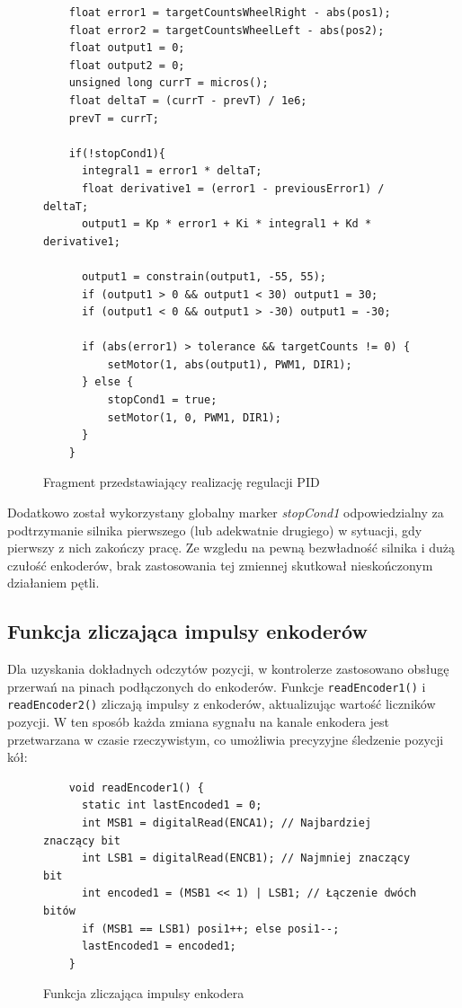 \begin{figure}[H]
  \centering
  \begin{lstlisting}
    float error1 = targetCountsWheelRight - abs(pos1);
    float error2 = targetCountsWheelLeft - abs(pos2);
    float output1 = 0;
    float output2 = 0;
    unsigned long currT = micros();
    float deltaT = (currT - prevT) / 1e6;
    prevT = currT;

    if(!stopCond1){
      integral1 = error1 * deltaT;
      float derivative1 = (error1 - previousError1) / deltaT;
      output1 = Kp * error1 + Ki * integral1 + Kd * derivative1;

      output1 = constrain(output1, -55, 55);
      if (output1 > 0 && output1 < 30) output1 = 30;
      if (output1 < 0 && output1 > -30) output1 = -30;

      if (abs(error1) > tolerance && targetCounts != 0) {
          setMotor(1, abs(output1), PWM1, DIR1);
      } else {
          stopCond1 = true;
          setMotor(1, 0, PWM1, DIR1);
      }
    }
  \end{lstlisting}
  \caption{Fragment przedstawiający realizację regulacji PID}
  \label{fig:pseudokod:pid}
\end{figure}

Dodatkowo został wykorzystany globalny marker \textit{stopCond1} odpowiedzialny za podtrzymanie silnika pierwszego (lub adekwatnie drugiego) w sytuacji, gdy pierwszy z nich zakończy pracę. Ze wzgledu na pewną bezwładność silnika i dużą czułość enkoderów, brak zastosowania tej zmiennej skutkował nieskończonym działaniem pętli. 

\subsection{Funkcja zliczająca impulsy enkoderów}

Dla uzyskania dokładnych odczytów pozycji, w kontrolerze zastosowano obsługę przerwań na pinach podłączonych do enkoderów. Funkcje \texttt{readEncoder1()} i \texttt{readEncoder2()} zliczają impulsy z enkoderów, aktualizując wartość liczników pozycji. W ten sposób każda zmiana sygnału na kanale enkodera jest przetwarzana w czasie rzeczywistym, co umożliwia precyzyjne śledzenie pozycji kół:

\begin{figure}[H]
  \centering
  \begin{lstlisting}
    void readEncoder1() {
      static int lastEncoded1 = 0;
      int MSB1 = digitalRead(ENCA1); // Najbardziej znaczący bit
      int LSB1 = digitalRead(ENCB1); // Najmniej znaczący bit
      int encoded1 = (MSB1 << 1) | LSB1; // Łączenie dwóch bitów
      if (MSB1 == LSB1) posi1++; else posi1--;
      lastEncoded1 = encoded1;
    }
  \end{lstlisting}
  \caption{Funkcja zliczająca impulsy enkodera}
  \label{fig:enc-count}
\end{figure}

